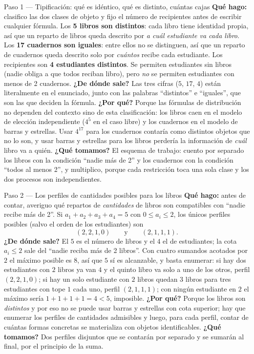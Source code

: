 \documentclass[11pt]{article}
\begin{document}
\begin{paso}{Paso 1 --- Tipificación: qué es idéntico, qué es distinto, cuántas cajas}
\textbf{Qué hago:} clasifico las dos clases de objeto y fijo el número de recipientes antes de escribir cualquier fórmula.
Los \textbf{5 libros son distintos}: cada libro tiene identidad propia, así que un reparto de libros queda descrito por \emph{a cuál estudiante va cada libro}. Los \textbf{17 cuadernos son iguales}: entre ellos no se distinguen, así que un reparto de cuadernos queda descrito solo por \emph{cuántos} recibe cada estudiante. Los recipientes son \textbf{4 estudiantes distintos}. Se permiten estudiantes sin libros (nadie obliga a que todos reciban libro), pero \emph{no} se permiten estudiantes con menos de 2 cuadernos.
\textbf{¿De dónde sale?} Las tres cifras ($5$, $17$, $4$) están literalmente en el enunciado, junto con las palabras ``distintos'' e ``iguales'', que son las que deciden la fórmula.
\textbf{¿Por qué?} Porque las fórmulas de distribución no dependen del contexto sino de esta clasificación: los libros caen en el modelo de elección independiente ($4^5$ en el caso libre) y los cuadernos en el modelo de barras y estrellas. Usar $4^{17}$ para los cuadernos contaría como distintos objetos que no lo son, y usar barras y estrellas para los libros perdería la información de \emph{cuál} libro va a quién.
\textbf{¿Qué tomamos?} El esquema de trabajo: cuento por separado los libros con la condición ``nadie más de 2'' y los cuadernos con la condición ``todos al menos 2'', y multiplico, porque cada restricción toca una sola clase y los dos procesos son independientes.
\end{paso}

\begin{paso}{Paso 2 --- Los perfiles de cantidades posibles para los libros}
\textbf{Qué hago:} antes de contar, averiguo qué repartos de \emph{cantidades} de libros son compatibles con ``nadie recibe más de 2''.
Si $a_1+a_2+a_3+a_4=5$ con $0\le a_i\le 2$, los únicos perfiles posibles (salvo el orden de los estudiantes) son
\[
(2,2,1,0)\qquad\text{y}\qquad (2,1,1,1).
\]
\textbf{¿De dónde sale?} El $5$ es el número de libros y el $4$ el de estudiantes; la cota $a_i\le 2$ sale del ``nadie reciba más de 2 libros''. Con cuatro sumandos acotados por $2$ el máximo posible es $8$, así que $5$ sí es alcanzable, y basta enumerar: si hay dos estudiantes con $2$ libros ya van $4$ y el quinto libro va solo a uno de los otros, perfil $(2,2,1,0)$; si hay un solo estudiante con $2$ libros quedan $3$ libros para tres estudiantes con tope $1$ cada uno, perfil $(2,1,1,1)$; con ningún estudiante en $2$ el máximo sería $1+1+1+1=4<5$, imposible.
\textbf{¿Por qué?} Porque los libros son \emph{distintos} y por eso no se puede usar barras y estrellas con cota superior; hay que enumerar los perfiles de cantidades admisibles y luego, para cada perfil, contar de cuántas formas concretas se materializa con objetos identificables.
\textbf{¿Qué tomamos?} Dos perfiles disjuntos que se contarán por separado y se sumarán al final, por el principio de la suma.
\end{paso}
\end{document}
